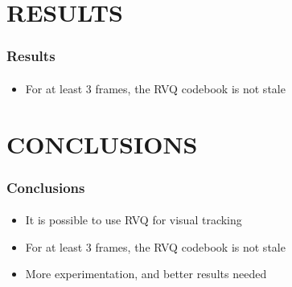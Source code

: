 \section{RESULTS}
\begin{frame}
\frametitle{Results}
\framesubtitle{}
\mypagenum
		\begin{itemize}
			\item For at least 3 frames, the RVQ codebook is not stale
	\end{itemize}
\end{frame}


\section{CONCLUSIONS}
\begin{frame}
\frametitle{Conclusions}
\framesubtitle{}
\mypagenum
	\begin{itemize}
		\item It is possible to use RVQ for visual tracking
		\item For at least 3 frames, the RVQ codebook is not stale
		\item More experimentation, and better results needed
	\end{itemize}
\end{frame}


\printbibliography

